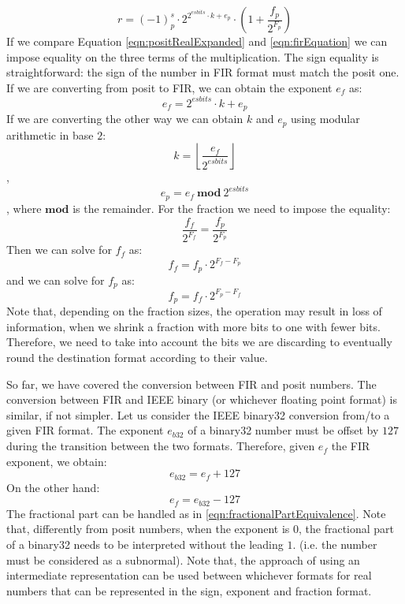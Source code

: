 \begin{equation}\label{eqn:positRealExpanded}
    r = (-1)^s_p \cdot 2^{2^{esbits} \cdot k + e_p} \cdot \left ( 1+ \frac{f_p}{2^{F_p}} \right)
\end{equation}
If we compare Equation \eqref{eqn:positRealExpanded} and \eqref{eqn:firEquation} we can impose equality on the three terms of the multiplication. The sign equality is straightforward: the sign of the number in FIR format must match the posit one.
If we are converting from posit to FIR, we can obtain the exponent $e_f$ as:
\begin{equation}
    e_f = 2^{esbits} \cdot k + e_p
\end{equation}
If we are converting the other way we can obtain $k$ and $e_p$ using modular arithmetic in base $2$: 
\begin{equation}
    k = \left\lfloor \frac{e_f}{2^{esbits}} \right\rfloor
\end{equation},
\begin{equation}
    e_p = e_f\ \mathbf{mod}\ 2^{esbits}
\end{equation},
where $\mathbf{mod}$ is the remainder.
For the fraction we need to impose the equality:
\begin{equation}\label{eqn:fractionalPartEquivalence}
    \frac{f_f}{2^{F_f}} = \frac{f_p}{2^{F_p}}
\end{equation}
Then we can solve for $f_f$ as:
\begin{equation}
    f_f = f_p \cdot 2^{F_f - F_p}
\end{equation}
and we can solve for $f_p$ as:
\begin{equation}
    f_p = f_f \cdot 2^{F_p - F_f}
\end{equation}
Note that, depending on the fraction sizes, the operation may result in loss of information, when we shrink a fraction with more bits to one with fewer bits.  Therefore, we need to take into account the bits we are discarding to eventually round the destination format according to their value.

So far, we have covered the conversion between FIR and posit numbers. The conversion between FIR and IEEE binary (or whichever floating point format) is similar, if not simpler.
Let us consider the IEEE binary32 conversion from/to a given FIR format. 
The exponent $e_{b32}$ of a binary32 number must be offset by $127$ during the transition between the two formats. Therefore, given $e_f$ the FIR exponent, we obtain:
\begin{equation}
    e_{b32} = e_f + 127
\end{equation}
On the other hand:
\begin{equation}
    e_{f} = e_{b32} - 127
\end{equation}
The fractional part can be handled as in \eqref{eqn:fractionalPartEquivalence}. Note that, differently from posit numbers, when the exponent is $0$, the fractional part of a binary32 needs to be interpreted without the leading $1.$ (i.e. the number must be considered as a subnormal).
Note that, the approach of using an intermediate representation can be used between whichever formats for real numbers that can be represented in the sign, exponent and fraction format.


